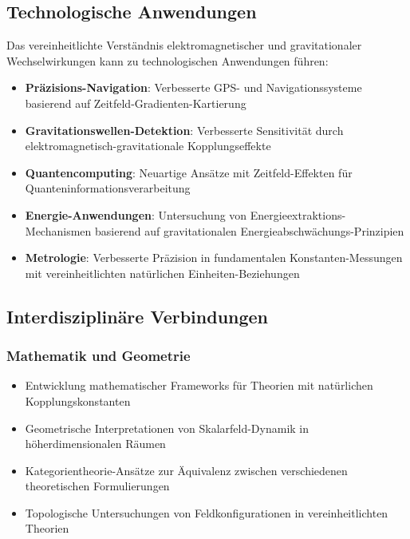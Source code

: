 \documentclass[12pt,a4paper]{article}
\begin{document}
	\subsection{Technologische Anwendungen}
	\label{subsec:technological_applications}
	
	Das vereinheitlichte Verständnis elektromagnetischer und gravitationaler Wechselwirkungen kann zu technologischen Anwendungen führen:
	
	\begin{itemize}
		\item \textbf{Präzisions-Navigation}: Verbesserte GPS- und Navigationssysteme basierend auf Zeitfeld-Gradienten-Kartierung
		\item \textbf{Gravitationswellen-Detektion}: Verbesserte Sensitivität durch elektromagnetisch-gravitationale Kopplungseffekte
		\item \textbf{Quantencomputing}: Neuartige Ansätze mit Zeitfeld-Effekten für Quanteninformationsverarbeitung
		\item \textbf{Energie-Anwendungen}: Untersuchung von Energieextraktions-Mechanismen basierend auf gravitationalen Energieabschwächungs-Prinzipien
		\item \textbf{Metrologie}: Verbesserte Präzision in fundamentalen Konstanten-Messungen mit vereinheitlichten natürlichen Einheiten-Beziehungen
	\end{itemize}
	
	\subsection{Interdisziplinäre Verbindungen}
	\label{subsec:interdisciplinary_connections}
	
	\subsubsection{Mathematik und Geometrie}
	\label{subsubsec:mathematics_geometry}
	
	\begin{itemize}
		\item Entwicklung mathematischer Frameworks für Theorien mit natürlichen Kopplungskonstanten
		\item Geometrische Interpretationen von Skalarfeld-Dynamik in höherdimensionalen Räumen
		\item Kategorientheorie-Ansätze zur Äquivalenz zwischen verschiedenen theoretischen Formulierungen
		\item Topologische Untersuchungen von Feldkonfigurationen in vereinheitlichten Theorien
	\end{itemize}
	
\end{document}
